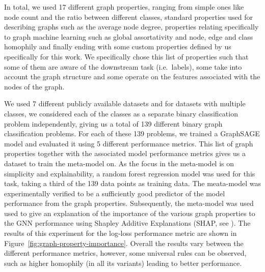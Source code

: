 In total, we used 17 different graph properties, ranging from simple ones like node count and the ratio between different classes, standard properties used for describing graphs such as the average node degree, properties relating specifically to graph machine learning such as global assortativity and node, edge and class homophily and finally ending with some custom properties defined by us specifically for this work. We specifically chose this list of properties such that some of them are aware of the downstream task (i.e.\ labels), some take into account the graph structure and some operate on the features associated with the nodes of the graph.

We used 7 different publicly available datasets and for datasets with multiple classes, we considered each of the classes as a separate binary classification problem independently, giving us a total of 139 different binary graph classification problems. For each of these 139 problems, we trained a GraphSAGE model and evaluated it using 5 different performance metrics. This list of graph properties together with the associated model performance metrics gives us a dataset to train the meta-model on. As the focus in the meta-model is on simplicity and explainability, a random forest regression model was used for this task, taking a third of the 139 data points as training data. The meata-model was experimentally verified to be a sufficiently good predictor of the model performance from the graph properties. Subsequently, the meta-model was used used to give an explanation of the importance of the various graph properties to the GNN performance using Shapley Additive Explanations (SHAP, see \cite{shapley_notes_1951}). The results of this experiment for the log-loss performance metric are shown in Figure~\ref{fig:graph-property-importance}. Overall the results vary between the different performance metrics, however, some universal rules can be observed, such as higher homophily (in all its variants) leading to better performance.


